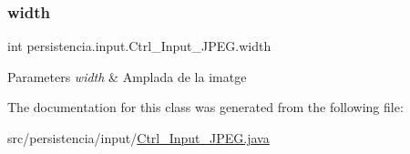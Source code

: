 \subsubsection{\texorpdfstring{width}{width}}
{\footnotesize\ttfamily int persistencia.\+input.\+Ctrl\+\_\+\+Input\+\_\+\+J\+P\+E\+G.\+width\hspace{0.3cm}{\ttfamily [package]}}


\begin{DoxyParams}{Parameters}
{\em width} & Amplada de la imatge \\
\hline
\end{DoxyParams}


The documentation for this class was generated from the following file\+:\begin{DoxyCompactItemize}
\item 
src/persistencia/input/\hyperlink{Ctrl__Input__JPEG_8java}{Ctrl\+\_\+\+Input\+\_\+\+J\+P\+E\+G.\+java}\end{DoxyCompactItemize}
